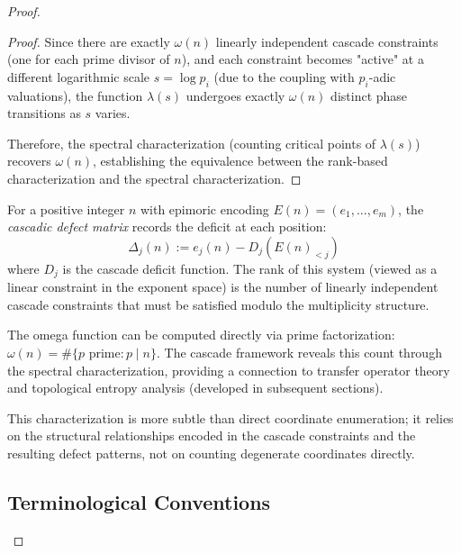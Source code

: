 \begin{proof}
\begin{proof}
Since there are exactly $\omega(n)$ linearly independent cascade constraints (one for each prime divisor of $n$), and each constraint becomes "active" at a different logarithmic scale $s = \log p_i$ (due to the coupling with $p_i$-adic valuations), the function $\lambda(s)$ undergoes exactly $\omega(n)$ distinct phase transitions as $s$ varies.

Therefore, the spectral characterization (counting critical points of $\lambda(s)$) recovers $\omega(n)$, establishing the equivalence between the rank-based characterization and the spectral characterization.

\end{proof}

\begin{definition}
\label{def:cascadic-defect-matrix}
For a positive integer $n$ with epimoric encoding $E(n) = (e_1, \ldots, e_m)$, the \emph{cascadic defect matrix} records the deficit at each position:
\begin{equation}
\Delta_j(n) := e_j(n) - D_j(E(n)_{<j})
\end{equation}
where $D_j$ is the cascade deficit function. The rank of this system (viewed as a linear constraint in the exponent space) is the number of linearly independent cascade constraints that must be satisfied modulo the multiplicity structure.
\end{definition}

\begin{observation}
The omega function can be computed directly via prime factorization: $\omega(n) = \#\{p \text{ prime} : p \mid n\}$. The cascade framework reveals this count through the spectral characterization, providing a connection to transfer operator theory and topological entropy analysis (developed in subsequent sections).

This characterization is more subtle than direct coordinate enumeration; it relies on the structural relationships encoded in the cascade constraints and the resulting defect patterns, not on counting degenerate coordinates directly.
\end{observation}

\subsection{Terminological Conventions}
\label{subsec:terminology}


\end{proof}
